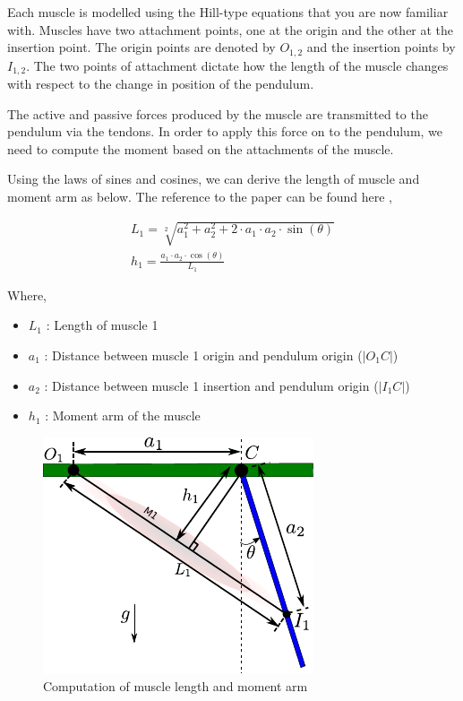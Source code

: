 \documentclass{cmc}
\begin{document}
Each muscle is modelled using the Hill-type equations that you are now
familiar with.  Muscles have two attachment points, one at the origin
and the other at the insertion point.  The origin points are denoted
by $O_{1,2}$ and the insertion points by $I_{1,2}$. The two points of
attachment dictate how the length of the muscle changes with respect
to the change in position of the pendulum.

The active and passive forces produced by the muscle are transmitted
to the pendulum via the tendons. In order to apply this force on to
the pendulum, we need to compute the moment based on the attachments
of the muscle.

Using the laws of sines and cosines, we can derive the length of
muscle and moment arm as below. The reference to the paper can be found here
\href{https://www.ncbi.nlm.nih.gov/pmc/articles/PMC5323435}{},

\begin{eqnarray}
  \label{eq:2}
  L_1 = \sqrt[2]{a_{1}^2 + a_{2}^2 + 2 \cdot a_1 \cdot a_2 \cdot \sin(\theta)} \\
  h_1 = \frac{a_1 \cdot a_2 \cdot \cos(\theta)}{L_1}
\end{eqnarray}

Where,

\begin{itemize}
\item $L_1$ : Length of muscle 1
\item $a_1$ : Distance between muscle 1 origin and pendulum origin
  ($|O_1C|$)
\item $a_2$ : Distance between muscle 1 insertion and pendulum origin
  ($|I_1C|$)
\item $h_1$ : Moment arm of the muscle
\end{itemize}

\begin{figure}[H]
  \centering
  \includegraphics[scale=1]{figures/pendulum_muscles_force_length.pdf}
  \caption[force_length]{Computation of muscle length and moment arm}
  \label{fig:pendulum_muscles_force_length}
\end{figure}
\end{document}
